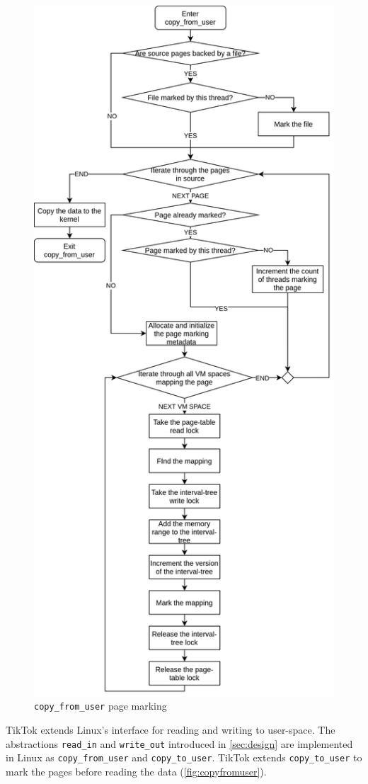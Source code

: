 \documentclass[conference]{IEEEtran}
\newcommand{\sysname}{TikTok}
\begin{document}
\begin{figure}[]
  \centering
  \includegraphics[width = 0.8\linewidth]{img/copy_from_user.png}
  \caption{\texttt{copy\_from\_user} page marking}
  \label{fig:copyfromuser}
\end{figure}

\sysname{} extends Linux's interface for reading and writing to user-space. The
abstractions \texttt{read\_in} and \texttt{write\_out} introduced in
\autoref{sec:design} are implemented in Linux as \texttt{copy\_from\_user} and
\texttt{copy\_to\_user}. \sysname{} extends \texttt{copy\_to\_user} to mark the pages
before reading the data (\autoref{fig:copyfromuser}).
\end{document}
